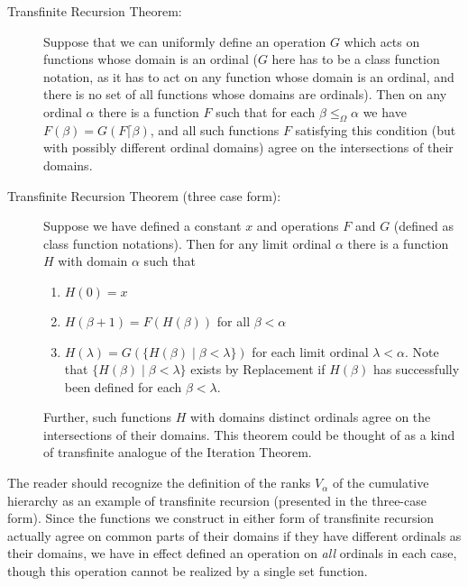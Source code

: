 \documentclass[12pt]{book}
\begin{document}
\begin{description}

\item[Transfinite Recursion Theorem:]  Suppose that we can uniformly define an operation $G$ which acts on functions whose domain is an ordinal ($G$ here has to be a class function notation, as it has to act on any function whose domain is an ordinal, and there is no set of all functions whose domains are ordinals).  Then on any ordinal $\alpha$ there is
a function $F$ such that for each $\beta \leq_{\Omega} \alpha$ we have $F(\beta)=G(F \lceil \beta)$, and all such functions $F$ satisfying this condition (but with possibly different ordinal domains) agree on the intersections of their domains.

\item[Transfinite Recursion Theorem (three case form):]   Suppose we have defined a constant $x$ and operations $F$ and $G$ (defined as class function notations).  Then for any limit ordinal $\alpha$ there is a function $H$ with domain $\alpha$ such that

\begin{enumerate}

\item $H(0) = x$

\item $H(\beta+1) = F(H(\beta))$ for all $\beta<\alpha$

\item $H(\lambda) = G(\{H(\beta)\mid \beta<\lambda\})$ for each limit ordinal $\lambda<\alpha$.  Note that $\{H(\beta)\mid \beta<\lambda\}$ exists by Replacement if $H(\beta)$ has successfully been defined for each $\beta<\lambda$.

\end{enumerate}

Further, such functions $H$ with domains distinct ordinals agree on the intersections of their domains.  This theorem could be thought of as a kind of transfinite analogue of the Iteration Theorem.

\end{description}

The reader should recognize the definition of the ranks $V_{\alpha}$ of the cumulative hierarchy as an example of transfinite recursion (presented in the three-case form).  Since the functions we construct in either form of transfinite recursion actually agree on common parts of their domains if they have different ordinals as their domains, we have in effect defined an operation on {\em all\/} ordinals in each case, though this operation cannot be realized by a single set function.
\end{document}
